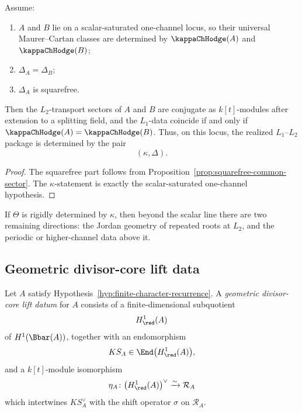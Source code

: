 \begin{proposition}
Assume:
\begin{enumerate}[label=\textup{(\roman*)}]
\item \(A\) and \(B\) lie on a scalar-saturated one-channel locus, so their universal Maurer--Cartan classes are determined by \(\kappaChHodge(A)\) and \(\kappaChHodge(B)\);
\item \(\Delta_A=\Delta_B\);
\item \(\Delta_A\) is squarefree.
\end{enumerate}
Then the \(L_2\)-transport sectors of \(A\) and \(B\) are conjugate as
\(k[t]\)-modules after extension to a splitting field, and the \(L_1\)-data
coincide if and only if \(\kappaChHodge(A)=\kappaChHodge(B)\).
Thus, on this locus, the realized \(L_1\)--\(L_2\) package is determined by the pair
\[
(\kappa,\Delta).
\]
\end{proposition}

\begin{proof}
The squarefree part follows from Proposition~\ref{prop:squarefree-common-sector}.
The \(\kappa\)-statement is exactly the scalar-saturated one-channel hypothesis.
\end{proof}

\begin{remark}
If \(\Theta\) is rigidly determined by \(\kappa\), then beyond the scalar line there are two remaining directions:
the Jordan geometry of repeated roots at \(L_2\), and the periodic or higher-channel data above it.
\end{remark}

\subsection{Geometric divisor-core lift data}

\begin{definition}
\label{def:geometric-divisor-core-lift-datum}
Let \(A\) satisfy Hypothesis~\ref{hyp:finite-character-recurrence}.
A \emph{geometric divisor-core lift datum} for \(A\) consists of a finite-dimensional
subquotient
\[
H^1_{\red}(A)
\]
of \(H^1(\Bbar(A))\), together with an endomorphism
\[
KS_A\in \End\bigl(H^1_{\red}(A)\bigr),
\]
and a \(k[t]\)-module isomorphism
\[
\eta_A\colon \bigl(H^1_{\red}(A)\bigr)^\vee\xrightarrow{\sim}\mathcal R_A
\]
which intertwines \(KS_A^\vee\) with the shift operator \(\sigma\) on \(\mathcal R_A\).
\end{definition}

